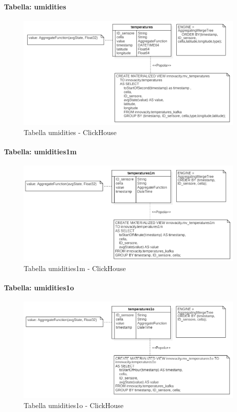 \paragraph{Tabella: umidities}
\begin{figure}[H]
    \centering
    \includegraphics[width=1\textwidth]{../Images/SpecificaTecnica/temperatures.PNG}
    \caption{Tabella umidities - ClickHouse}
    \label{fig:umidities}
  \end{figure}
\paragraph{Tabella: umidities1m}
    \begin{figure}[H]
        \centering
        \includegraphics[width=1\textwidth]{../Images/SpecificaTecnica/temperatures1m.PNG}
        \caption{Tabella  umidities1m - ClickHouse}
        \label{fig: umidities1m}
      \end{figure}
      \paragraph{Tabella:  umidities1o}
      \begin{figure}[H]
          \centering
          \includegraphics[width=1\textwidth]{../Images/SpecificaTecnica/temperatures1o.PNG}
          \caption{Tabella  umidities1o - ClickHouse}
          \label{fig: umidities1o}
        \end{figure}
